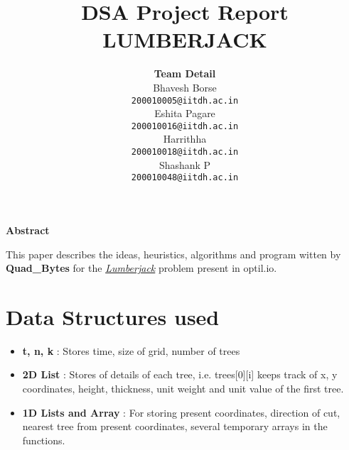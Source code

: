 \documentclass[30pt]{article}
\begin{document}
	\title{\HUGE DSA Project Report LUMBERJACK}
     \vspace{60em}
	\author{ \LARGE \textbf {Team Detail} \\ 
		Bhavesh Borse \\ \texttt{200010005@iitdh.ac.in \\}
		Eshita Pagare \\ \texttt{200010016@iitdh.ac.in \\}
		Harrithha \\ \texttt{200010018@iitdh.ac.in \\}
		Shashank P \\ \texttt{200010048@iitdh.ac.in}}
	\date{}
	\maketitle
\newpage
\begin{center}
   \Large \textbf{Abstract}
\end{center}
This  paper describes the ideas, heuristics, algorithms and program witten by \textbf{Quad\_Bytes} for the \textit{\href{https://www.optil.io/optilion/problem/3000}{Lumberjack}} problem present in optil.io.
\section{Data Structures used}
\begin{itemize}
\item \textbf{t, n, k} : Stores time, size of grid, number of trees
\item \textbf{2D List} : Stores  of details of each tree, i.e. trees[0][i] keeps track of x, y coordinates, height, thickness, unit weight and unit value of the first tree.
\item \textbf{1D Lists and Array} : For storing present coordinates, direction of cut, nearest tree from present coordinates, several temporary arrays in the functions.
\end{itemize}
\end{document}
